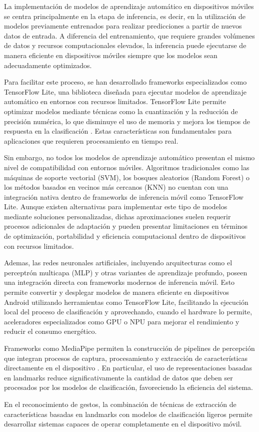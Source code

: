 	La implementación de modelos de aprendizaje automático en dispositivos móviles se centra principalmente en la etapa de inferencia, es decir, en la utilización de modelos previamente entrenados para realizar predicciones a partir de nuevos datos de entrada. A diferencia del entrenamiento, que requiere grandes volúmenes de datos y recursos computacionales elevados, la inferencia puede ejecutarse de manera eficiente en dispositivos móviles siempre que los modelos sean adecuadamente optimizados.
	
	Para facilitar este proceso, se han desarrollado frameworks especializados como TensorFlow Lite, una biblioteca diseñada para ejecutar modelos de aprendizaje automático en entornos con recursos limitados. TensorFlow Lite permite optimizar modelos mediante técnicas como la cuantización y la reducción de precisión numérica, lo que disminuye el uso de memoria y mejora los tiempos de respuesta en la clasificación \cite{tensorflow_lite}. Estas características son fundamentales para aplicaciones que requieren procesamiento en tiempo real.
	
	Sin embargo, no todos los modelos de aprendizaje automático presentan el mismo nivel de compatibilidad con entornos móviles. Algoritmos tradicionales como las máquinas de soporte vectorial (SVM), los bosques aleatorios (Random Forest) o los métodos basados en vecinos más cercanos (KNN) no cuentan con una integración nativa dentro de frameworks de inferencia móvil como TensorFlow Lite. Aunque existen alternativas para implementar este tipo de modelos mediante soluciones personalizadas, dichas aproximaciones suelen requerir procesos adicionales de adaptación y pueden presentar limitaciones en términos de optimización, portabilidad y eficiencia computacional dentro de dispositivos con recursos limitados.
	
	Ademas, las redes neuronales artificiales, incluyendo arquitecturas como el perceptrón multicapa (MLP) y otras variantes de aprendizaje profundo, poseen una integración directa con frameworks modernos de inferencia móvil. Esto permite convertir y desplegar modelos de manera eficiente en dispositivos Android utilizando herramientas como TensorFlow Lite, facilitando la ejecución local del proceso de clasificación y aprovechando, cuando el hardware lo permite, aceleradores especializados como GPU o NPU para mejorar el rendimiento y reducir el consumo energético.
	
	Frameworks como MediaPipe permiten la construcción de pipelines de percepción que integran procesos de captura, procesamiento y extracción de características directamente en el dispositivo \cite{lugaresi2019mediapipe}. En particular, el uso de representaciones basadas en landmarks reduce significativamente la cantidad de datos que deben ser procesados por los modelos de clasificación, favoreciendo la eficiencia del sistema.
	
	En el reconocimiento de gestos, la combinación de técnicas de extracción de características basadas en landmarks con modelos de clasificación ligeros permite desarrollar sistemas capaces de operar completamente en el dispositivo móvil.
	
